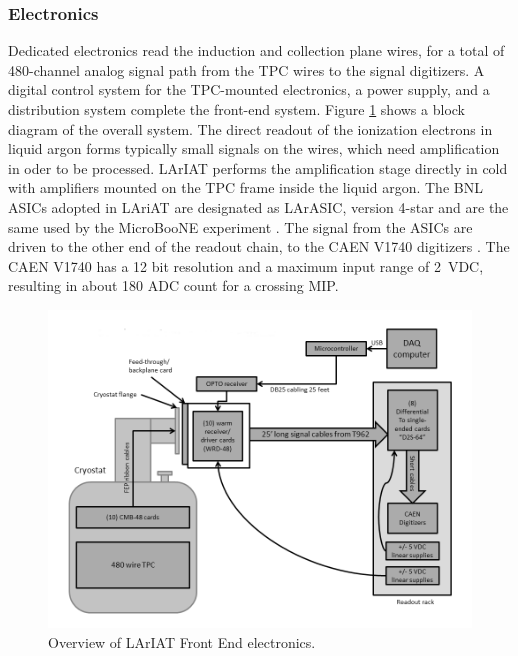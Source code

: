 \subsubsection{Electronics}

Dedicated electronics read the induction and collection plane wires, for a total of  480-channel analog signal path from the TPC wires to the signal digitizers. A digital control system for the TPC-mounted electronics, a power supply, and a distribution system complete the front-end system. Figure \ref{pic:FEelectronics} shows a block diagram of the overall system. The direct readout of the ionization electrons in liquid argon forms typically small signals on the wires, which need amplification in oder to be processed. LArIAT  performs the amplification stage directly in cold with  amplifiers %
mounted on the TPC frame inside the liquid argon. The BNL ASICs adopted in LAriAT are designated as LArASIC, version 4-star and are the same used by the MicroBooNE experiment \cite{Acciarri2017}.
The signal from the ASICs are driven to the other end of the readout chain, to the CAEN V1740 digitizers \cite{CAENV1740}. The CAEN V1740 has a 12 bit resolution and a maximum input range of 2~VDC, resulting in about 180 ADC count for a crossing MIP.   

\begin{figure}[htbp]
 \centering
 \includegraphics[width=1.0\textwidth]{Chapter-3/Images/LArIAT_FE_Electronics.png}
\caption{Overview of LArIAT Front End electronics. } 
\label{pic:FEelectronics}
\end{figure}




